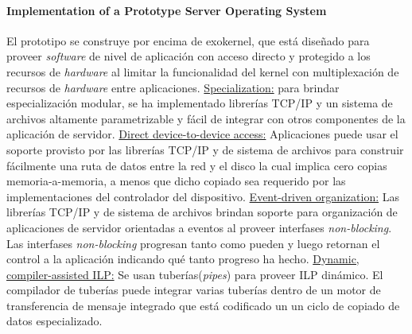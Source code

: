 \paragraph{\textnormal{\textbf{Implementation of a Prototype Server Operating System}}}
El prototipo se construye por encima de exokernel, que está diseñado para proveer \textit{software} de nivel de aplicación con acceso directo y protegido a los recursos de \textit{hardware} al limitar la funcionalidad del kernel con multiplexación de recursos de \textit{hardware} entre aplicaciones. \underline{Specialization:} para brindar especialización modular, se ha implementado librerías TCP/IP y un sistema de archivos altamente parametrizable y fácil de integrar con otros componentes de la aplicación de servidor. \underline{Direct device-to-device access:} Aplicaciones puede usar el soporte provisto por las librerías TCP/IP y de sistema de archivos para construir fácilmente una ruta de datos entre la red y el disco la cual implica cero copias memoria-a-memoria, a menos que dicho copiado sea requerido por las implementaciones del controlador del dispositivo. \underline{Event-driven organization:} Las librerías TCP/IP y de sistema de archivos brindan soporte para organización de aplicaciones de servidor orientadas a eventos al proveer interfases \textit{non-blocking}. Las interfases \textit{non-blocking} progresan tanto como pueden y luego retornan el control a la aplicación indicando qué tanto progreso ha hecho. \underline{Dynamic, compiler-assisted ILP:} Se usan tuberías(\textit{pipes}) para proveer ILP dinámico. El compilador de tuberías puede integrar varias tuberías dentro de un motor de transferencia de mensaje integrado que está codificado un un ciclo de copiado de datos especializado.

